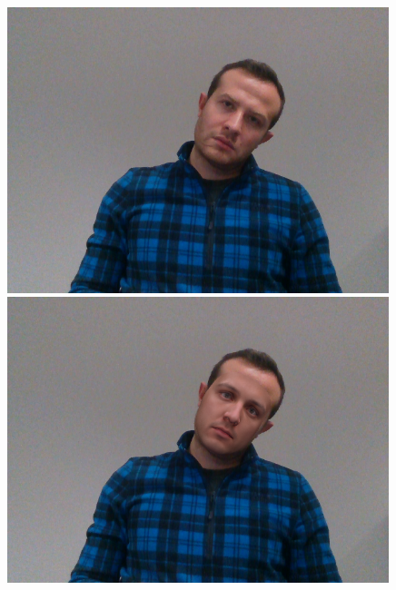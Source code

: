 \begin{figure}[h]
    \begin{minipage}{.325\textwidth}
      \centering
      \includegraphics[width=0.99\textwidth]{Figures/dataset/target/7.png}
    \end{minipage}
    \begin{minipage}{.325\textwidth}
      \centering
      \includegraphics[width=0.99\textwidth]{Figures/dataset/our/7blended.png}
    \end{minipage}
    \begin{minipage}{.325\textwidth}
      \centering

\end{minipage}
\end{figure}
